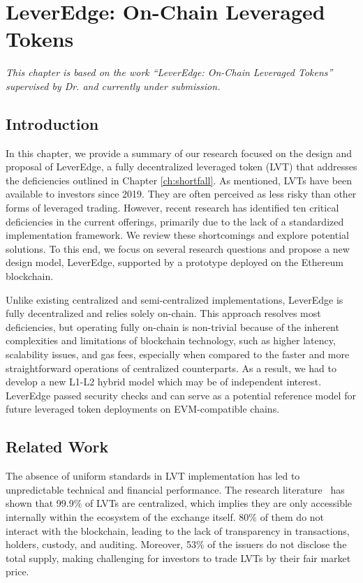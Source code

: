 
\chapter{LeverEdge: On-Chain Leveraged Tokens}\label{ch:leveredge}

\textit{This chapter is based on the work ``LeverEdge: On-Chain Leveraged Tokens'' supervised by Dr. \supv and currently under submission.}

\section{Introduction}
In this chapter, we provide a summary of our research focused on the design and proposal of LeverEdge, a fully decentralized leveraged token (LVT) that addresses the deficiencies outlined in Chapter \ref{ch:shortfall}. As mentioned, LVTs have been available to investors since 2019. They are often perceived as less risky than other forms of leveraged trading. However, recent research has identified ten critical deficiencies in the current offerings, primarily due to the lack of a standardized implementation framework. We review these shortcomings and explore potential solutions. To this end, we focus on several research questions and propose a new design model, LeverEdge, supported by a prototype deployed on the Ethereum blockchain. 

Unlike existing centralized and semi-centralized implementations, LeverEdge is fully decentralized and relies solely on-chain. This approach resolves most deficiencies, but operating fully on-chain is non-trivial because of the inherent complexities and limitations of blockchain technology, such as higher latency, scalability issues, and gas fees, especially when compared to the faster and more straightforward operations of centralized counterparts. As a result, we had to develop a new L1-L2 hybrid model which may be of independent interest. LeverEdge passed security checks and can serve as a potential reference model for future leveraged token deployments on EVM-compatible chains.

\section{Related Work}
The absence of uniform standards in LVT implementation has led to unpredictable technical and financial performance. The research literature~\cite{shortfall,khomyn2020value,szpruch2024leveraged,Sullivan_2009} has shown that 99.9\% of LVTs are centralized, which implies they are only accessible internally within the ecosystem of the exchange itself. 80\% of them do not interact with the blockchain, leading to the lack of transparency in transactions, holders, custody, and auditing. Moreover, 53\% of the issuers do not disclose the total supply, making challenging for investors to trade LVTs by their fair market price. 

